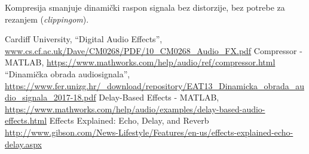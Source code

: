 \documentclass[conference]{IEEEtran}
\begin{document}
Kompresija smanjuje dinamički raspon signala bez distorzije, bez potrebe za rezanjem
(\textit{clippingom}).

\begin{thebibliography}{00}
 Cardiff University, ``Digital Audio Effects'',
	\url{www.cs.cf.ac.uk/Dave/CM0268/PDF/10_CM0268_Audio_FX.pdf}
   Compressor - MATLAB,
  \url{https://www.mathworks.com/help/audio/ref/compressor.html}
   ``Dinamička obrada audiosignala'',
  \url{https://www.fer.unizg.hr/_download/repository/EAT13_Dinamicka_obrada_audio_signala_2017-18.pdf}
   Delay-Based Effects - MATLAB,
  \url{https://www.mathworks.com/help/audio/examples/delay-based-audio-effects.html}
   Effects Explained: Echo, Delay, and Reverb
  \url{http://www.gibson.com/News-Lifestyle/Features/en-us/effects-explained-echo-delay.aspx}
\end{thebibliography}
\end{document}
